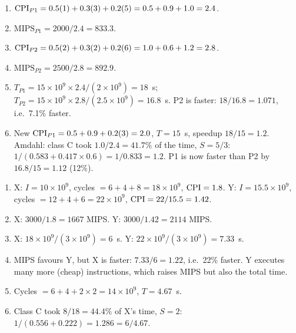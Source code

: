\documentclass[11pt]{article}
\begin{document}
\begin{solution}[\ref{x:p1p2}]
\leavevmode
\begin{enumerate}[label=(\alph*),leftmargin=*]
  \item $\mathrm{CPI}_{P1} = 0.5(1)+0.3(3)+0.2(5) = 0.5+0.9+1.0 = 2.4$.
  \item $\text{MIPS}_{P1} = 2000/2.4 = 833.3$.
  \item $\mathrm{CPI}_{P2} = 0.5(2)+0.3(2)+0.2(6) = 1.0+0.6+1.2 = 2.8$.
  \item $\text{MIPS}_{P2} = 2500/2.8 = 892.9$.
  \item $T_{P1} = 15\times10^9\times2.4/(2\times10^9) = 18$~s;
  $T_{P2} = 15\times10^9\times2.8/(2.5\times10^9) = 16.8$~s. P2 is faster:
  $18/16.8 = 1.071$, i.e.\ 7.1\% faster.
  \item New $\mathrm{CPI}_{P1} = 0.5+0.9+0.2(3) = 2.0$, $T = 15$~s, speedup $18/15 =
  1.2$. Amdahl: class C took $1.0/2.4 = 41.7\%$ of the time, $S = 5/3$:
  $1/(0.583 + 0.417\times0.6) = 1/0.833 = 1.2$. P1 is now faster than P2 by
  $16.8/15 = 1.12$ (12\%).
\end{enumerate}
\end{solution}

\begin{solution}[\ref{x:compilers}]
\leavevmode
\begin{enumerate}[label=(\alph*),leftmargin=*]
  \item X: $I = 10\times10^9$, cycles $= 6+4+8 = 18\times10^9$, $\mathrm{CPI} = 1.8$.
  Y: $I = 15.5\times10^9$, cycles $= 12+4+6 = 22\times10^9$, $\mathrm{CPI} = 22/15.5
  = 1.42$.
  \item X: $3000/1.8 = 1667$ MIPS. Y: $3000/1.42 = 2114$ MIPS.
  \item X: $18\times10^9/(3\times10^9) = 6$~s. Y: $22\times10^9/(3\times10^9)
  = 7.33$~s.
  \item MIPS favours Y, but X is faster: $7.33/6 = 1.22$, i.e.\ 22\% faster.
  Y executes many more (cheap) instructions, which raises MIPS but also the
  total time.
  \item Cycles $= 6 + 4 + 2\times2 = 14\times10^9$, $T = 4.67$~s.
  \item Class C took $8/18 = 44.4\%$ of X's time, $S = 2$:
  $1/(0.556 + 0.222) = 1.286 = 6/4.67$. \checkmark
\end{enumerate}
\end{solution}
\end{document}
